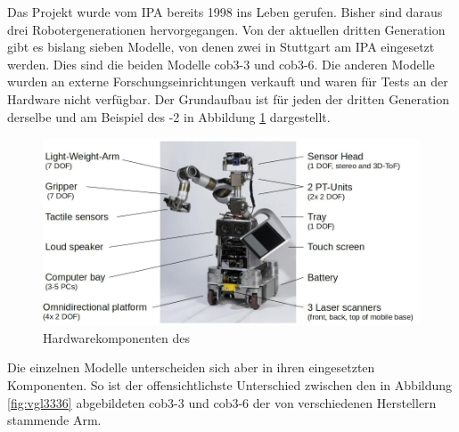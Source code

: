 Das Projekt \cob wurde vom \ac{IPA} bereits 1998 ins Leben gerufen. Bisher sind
daraus drei Robotergenerationen hervorgegangen. Von der aktuellen dritten
Generation gibt es bislang sieben Modelle, von denen zwei in Stuttgart am \ac{IPA}
eingesetzt werden. Dies sind die beiden Modelle cob3-3 und cob3-6. Die anderen
Modelle wurden an externe Forschungseinrichtungen verkauft und waren für Tests
an der Hardware nicht verfügbar. Der Grundaufbau ist für jeden \cob der dritten
Generation derselbe und am Beispiel des -2 in Abbildung \ref{setup} dargestellt.

\begin{figure}[Hht]
\centering
\includegraphics[width=\textwidth]{images/hw_setup_with_text}
\caption{Hardwarekomponenten des \cob}
\label{setup}
\end{figure}

  Die einzelnen Modelle unterscheiden sich aber in ihren
eingesetzten Komponenten. So ist der offensichtlichste Unterschied zwischen
den in Abbildung \ref{fig:vgl3336} abgebildeten cob3-3 und cob3-6 der von verschiedenen Herstellern stammende Arm. 


